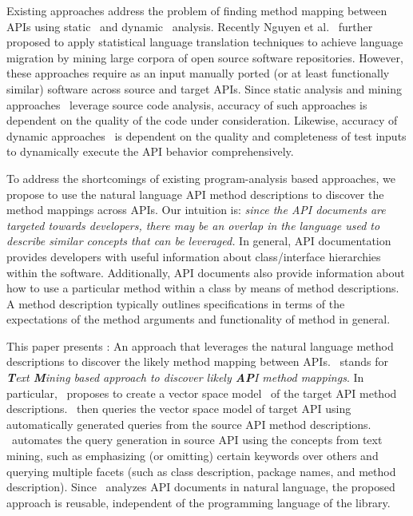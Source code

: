 Existing approaches
address the problem of finding method mapping between APIs using
static~\cite{Zhong2010ICSE} and dynamic~\cite{Gokhale2013ICSE} analysis. 
Recently Nguyen et al.~\cite{nguyen2014statistical} further proposed to
apply statistical language translation techniques to achieve language migration
by mining large corpora of open source software repositories.
However, these approaches require as an input manually ported
(or at least functionally similar) software across source and target APIs.
Since static analysis and mining approaches~\cite{Zhong2010ICSE,nguyen2014statistical}
leverage source code analysis, 
accuracy of such approaches is dependent on the quality of the code under consideration.
Likewise, accuracy of dynamic approaches~\cite{Gokhale2013ICSE} is dependent on
the quality and completeness of test inputs
to dynamically execute the API behavior comprehensively. 


To address the shortcomings of existing program-analysis based approaches,
we propose to use the natural language API method descriptions
to discover the method mappings across APIs.
Our intuition is:
\textit{since the API documents are targeted towards developers,
	there may be an overlap in the language used to describe similar concepts that can be leveraged.}
In general, API documentation provides developers with useful information
about class/interface hierarchies within the software.
Additionally, API documents also provide information about
how to use a particular method within a class by means of method descriptions.
A method description typically outlines specifications in terms of
the expectations of the method arguments and functionality of method in general.


This paper presents \tool : An approach that leverages the natural language method descriptions to discover the likely method mapping between APIs.
\tool\ stands for \textit{\textbf{T}ext \textbf{M}ining
	based approach to discover likely \textbf{AP}I method mappings}.
In particular, \tool\ proposes to create a vector space model~\cite{singhal2001modern,manning2008introduction} of the target API method descriptions. 
\tool\ then queries the vector space model of target API using
automatically generated queries from the source API method descriptions.
\tool\ automates the query generation in source API using the concepts from text mining, such as emphasizing (or omitting) certain keywords over others and querying multiple facets (such as class description, package names, and method description).
Since \tool\ analyzes API documents in natural language, the proposed approach is reusable, independent of the programming language of the library.

